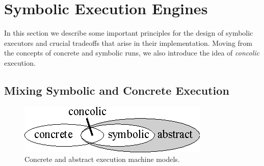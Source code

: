 
\section{Symbolic Execution Engines}
\label{se:executors}

In this section we describe some important principles for the design of symbolic executors and crucial tradeoffs that arise in their implementation. Moving from the concepts of concrete and symbolic runs, we also introduce the idea of {\em concolic} execution.

\subsection{Mixing Symbolic and Concrete Execution}
\label{ss:concrete-concolic-symbolic}

\begin{figure}[t]
\centering
\includegraphics[width=0.35\columnwidth]{images/concrete-abstract.eps} 
\caption{Concrete and abstract execution machine models.}
\label{fig:concrete-symbolic}
\end{figure}

